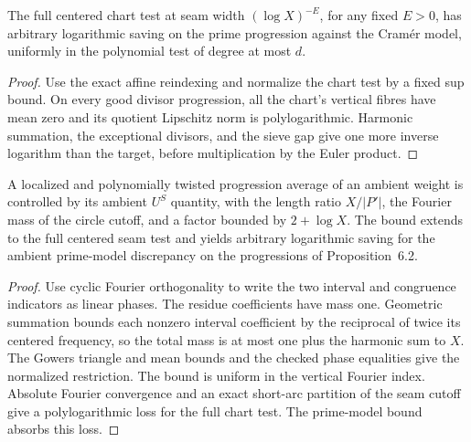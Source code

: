 \begin{lemma}\label{checked-prime-cramer}
\leanok
The full centered chart test at seam width $(\log X)^{-E}$,
for any fixed $E>0$, has arbitrary logarithmic saving on the
prime progression against the Cram\'er model, uniformly in the
polynomial test of degree at most $d$.
\end{lemma}
\begin{proof}
\leanok
Use the exact affine reindexing and normalize the chart test by a
fixed sup bound. On every good divisor progression, all the chart's
vertical fibres have mean zero and its quotient Lipschitz norm
is polylogarithmic. Harmonic summation, the exceptional divisors,
and the sieve gap give one more inverse logarithm than the target,
before multiplication by the Euler product.
\end{proof}

\begin{lemma}\label{checked-fourier-restriction}
\leanok
A localized and polynomially twisted progression average of an
ambient weight is controlled by its ambient $U^S$ quantity, with the
length ratio $X/|P'|$, the Fourier mass of the circle cutoff, and
a factor bounded by $2+\log X$. The bound extends to the full
centered seam test and yields arbitrary logarithmic saving for the
ambient prime-model discrepancy on the progressions of Proposition~6.2.
\end{lemma}
\begin{proof}
\leanok
Use cyclic Fourier orthogonality to write the two interval and
congruence indicators as linear phases. The residue coefficients
have mass one. Geometric summation bounds each nonzero interval
coefficient by the reciprocal of twice its centered frequency,
so the total mass is at most one plus the harmonic sum to $X$.
The Gowers triangle and mean bounds and the checked phase
equalities give the normalized restriction.
The bound is uniform in the vertical Fourier index. Absolute Fourier
convergence and an exact short-arc partition of the seam cutoff give a
polylogarithmic loss for the full chart test. The prime-model bound
absorbs this loss.
\end{proof}

